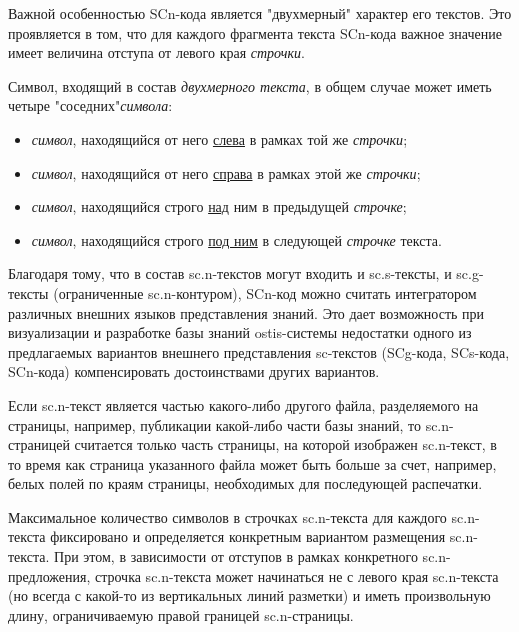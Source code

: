 Важной особенностью SCn-кода является "двухмерный"{} характер его текстов. Это проявляется в том, что для каждого фрагмента текста SCn-кода важное значение имеет величина отступа от левого края \textit{строчки}.


Символ, входящий в состав \textit{двухмерного текста}, в общем случае может иметь четыре "соседних"{}\textit{символа}: 
\begin{itemize}
	\item \textit{символ}, находящийся от него \uline{слева} в рамках той же \textit{строчки};
	\item \textit{символ}, находящийся от него \uline{справа} в рамках этой же \textit{строчки};
	\item \textit{символ}, находящийся строго \uline{над} ним в предыдущей \textit{строчке};
	\item \textit{символ}, находящийся строго \uline{под ним} в следующей \textit{строчке} текста.
\end{itemize}


Благодаря тому, что в состав sc.n-текстов могут входить и sc.s-тексты, и sc.g-тексты (ограниченные sc.n-контуром), SCn-код можно считать интегратором различных внешних языков представления знаний.  Это дает возможность при визуализации и разработке базы знаний ostis-системы недостатки одного из предлагаемых вариантов внешнего представления sc-текстов (SCg-кода, SCs-кода, SCn-кода) компенсировать достоинствами других вариантов.

\begin{SCn}
\end{SCn}

Если sc.n-текст является частью какого-либо другого файла, разделяемого на страницы, например, публикации какой-либо части базы знаний, то sc.n-страницей считается только часть страницы, на которой изображен sc.n-текст, в то время как страница указанного файла может быть больше за счет, например, белых полей по краям страницы, необходимых для последующей распечатки.

\begin{SCn}
\end{SCn}
Максимальное количество символов в строчках sc.n-текста для каждого sc.n-текста фиксировано и определяется конкретным вариантом размещения sc.n-текста. При этом, в зависимости от отступов в рамках конкретного sc.n-предложения, строчка sc.n-текста может начинаться не с левого края sc.n-текста (но всегда с какой-то из вертикальных линий разметки) и иметь произвольную длину, ограничиваемую правой границей sc.n-страницы.

